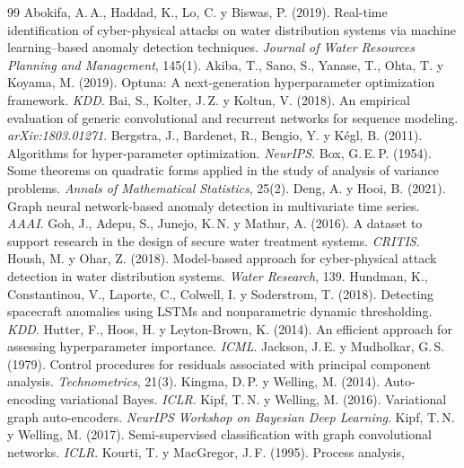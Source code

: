 \documentclass[11pt,a4paper]{article}
\begin{document}
\begin{thebibliography}{99}
 Abokifa, A.\,A., Haddad, K., Lo, C. y Biswas, P. (2019).
  Real-time identification of cyber-physical attacks on water distribution systems via
  machine learning--based anomaly detection techniques. \emph{Journal of Water Resources
  Planning and Management}, 145(1).
 Akiba, T., Sano, S., Yanase, T., Ohta, T. y Koyama, M. (2019).
  Optuna: A next-generation hyperparameter optimization framework. \emph{KDD}.
 Bai, S., Kolter, J.\,Z. y Koltun, V. (2018). An empirical evaluation
  of generic convolutional and recurrent networks for sequence modeling.
  \emph{arXiv:1803.01271}.
 Bergstra, J., Bardenet, R., Bengio, Y. y Kégl, B. (2011).
  Algorithms for hyper-parameter optimization. \emph{NeurIPS}.
 Box, G.\,E.\,P. (1954). Some theorems on quadratic forms applied in
  the study of analysis of variance problems. \emph{Annals of Mathematical Statistics},
  25(2).
 Deng, A. y Hooi, B. (2021). Graph neural network-based anomaly
  detection in multivariate time series. \emph{AAAI}.
 Goh, J., Adepu, S., Junejo, K.\,N. y Mathur, A. (2016). A dataset to
  support research in the design of secure water treatment systems. \emph{CRITIS}.
 Housh, M. y Ohar, Z. (2018). Model-based approach for
  cyber-physical attack detection in water distribution systems. \emph{Water Research},
  139.
 Hundman, K., Constantinou, V., Laporte, C., Colwell, I. y
  Soderstrom, T. (2018). Detecting spacecraft anomalies using LSTMs and nonparametric
  dynamic thresholding. \emph{KDD}.
 Hutter, F., Hoos, H. y Leyton-Brown, K. (2014). An efficient
  approach for assessing hyperparameter importance. \emph{ICML}.
 Jackson, J.\,E. y Mudholkar, G.\,S. (1979). Control procedures
  for residuals associated with principal component analysis. \emph{Technometrics},
  21(3).
 Kingma, D.\,P. y Welling, M. (2014). Auto-encoding variational
  Bayes. \emph{ICLR}.
 Kipf, T.\,N. y Welling, M. (2016). Variational graph auto-encoders.
  \emph{NeurIPS Workshop on Bayesian Deep Learning}.
 Kipf, T.\,N. y Welling, M. (2017). Semi-supervised classification
  with graph convolutional networks. \emph{ICLR}.
 Kourti, T. y MacGregor, J.\,F. (1995). Process analysis,

\end{thebibliography}
\end{document}
